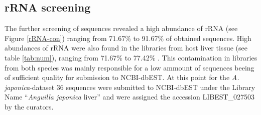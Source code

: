 \subsection*{rRNA screening}
\label{rRNA-pil}

The further screening of sequences revealed a high abundance of rRNA
(see Figure \ref{rRNA-con}) ranging from 71.67\% to 91.67\% of
obtained sequences.  High abundances of rRNA were also found in the
libraries from host liver tissue (see table \ref{tab:num}), ranging
from 71.67\% to 77.42\% . This contamination in libraries from both
species was mainly responsible for a low ammount of sequences beeing
of sufficient quality for submission to NCBI-dbEST. At this point for
the \textit{A. japonica}-dataset 36 sequences were submitted to
NCBI-dbEST under the Library Name ``\textit{Anguilla japonica} liver''
and were assigned the accession LIBEST\_027503 by the curators.


